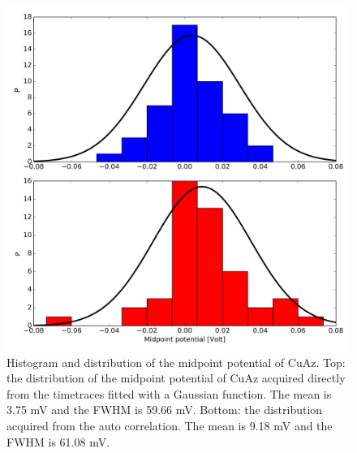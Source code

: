 \documentclass[twoside,single]{lion-msc}
\begin{document}
\begin{figure}[ht!]
\centering
\includegraphics[width=\textwidth]{midpointhistograms}
\caption{Histogram and distribution of the midpoint potential of CuAz. Top: the distribution of the midpoint potential of CuAz acquired directly from the timetraces fitted with a Gaussian function. The mean is 3.75 mV and the FWHM is 59.66 mV. Bottom: the distribution acquired from the auto correlation. The mean is 9.18 mV and the FWHM is 61.08 mV.}
\label{t_ratio_plot}
\end{figure}



\end{document}
